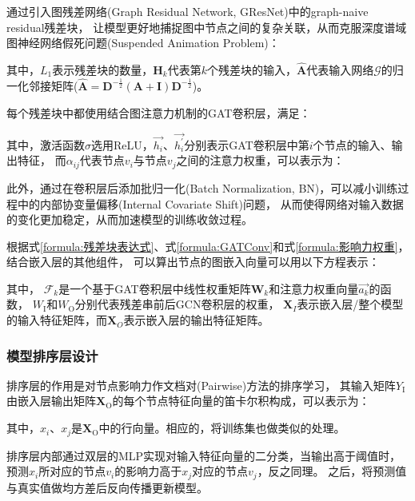 \documentclass[twocolumn]{morningstar}
\begin{document}
通过引入图残差网络\cite{zhang2019GResNet}(Graph Residual Network, GResNet)中的graph-naive residual残差块，
让模型更好地捕捉图中节点之间的复杂关联，从而克服深度谱域图神经网络假死问题(Suspended Animation Problem)：

\noindent 其中，$L_1$表示残差块的数量，$\mathbf{H}_{k}$代表第$k$个残差块的输入，$\hat{\mathbf{A}}$代表输入网络$\mathcal{G}$的归一化邻接矩阵($\hat{\mathbf{A}} = \mathbf{D}^{-\frac{1}{2}}(\mathbf{A}+\mathbf{I}) \mathbf{D}^{-\frac{1}{2}}$)。

每个残差块中都使用结合图注意力机制的GAT卷积层，满足：

\noindent 其中，激活函数$\sigma$选用ReLU，$\vec{h_i}$、$\vec{h_i^\prime}$分别表示GAT卷积层中第$i$个节点的输入、输出特征，
而$\alpha_{ij}$代表节点$v_i$与节点$v_j$之间的注意力权重，可以表示为：


此外，通过在卷积层后添加批归一化(Batch Normalization, BN)，可以减小训练过程中的内部协变量偏移(Internal Covariate Shift)问题，
从而使得网络对输入数据的变化更加稳定，从而加速模型的训练收敛过程。

根据式\ref{formula:残差块表达式}、式\ref{formula:GATConv}和式\ref{formula:影响力权重}，结合嵌入层的其他组件，
可以算出节点的图嵌入向量可以用以下方程表示：



\noindent 其中，
$\mathcal{F}_k$是一个基于GAT卷积层中线性权重矩阵$\mathbf{W}_k$和注意力权重向量$\vec{a_{k}}$的函数，
$W_\mathrm{I}$和$W_\mathrm{O}$分别代表残差串前后GCN卷积层的权重，
$\mathbf{X}_{I}$表示嵌入层/整个模型的输入特征矩阵，而$\mathbf{X}_{O}$表示嵌入层的输出特征矩阵。

\subsubsection{模型排序层设计}\label{sec:RankingLayer}
排序层的作用是对节点影响力作文档对(Pairwise)方法的排序学习，
其输入矩阵$Y_\mathrm{I}$由嵌入层输出矩阵$\mathbf{X}_\mathrm{O}$的每个节点特征向量的笛卡尔积构成，可以表示为：



\noindent 其中，$x_i$、$x_j$是$\mathbf{X}_\mathrm{O}$中的行向量。相应的，将训练集也做类似的处理。



排序层内部通过双层的MLP实现对输入特征向量的二分类，当输出高于阈值时，预测$x_i$所对应的节点$v_i$的影响力高于$x_j$对应的节点$v_j$，反之同理。
之后，将预测值与真实值做均方差后反向传播更新模型。
\end{document}
